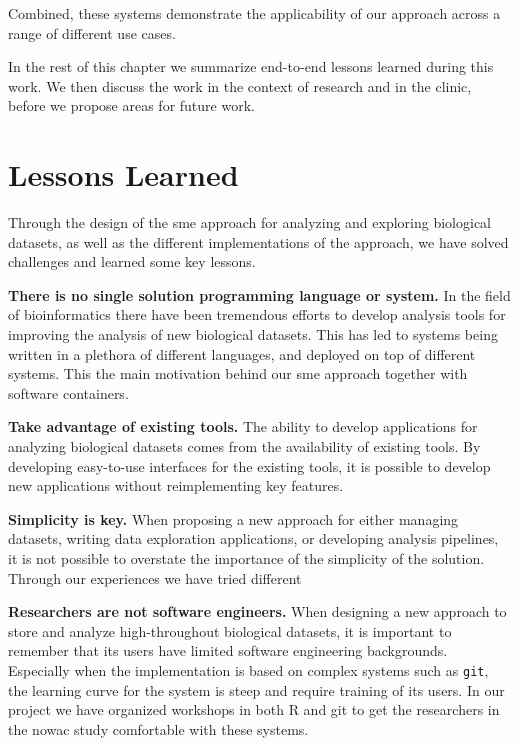 Combined, these systems demonstrate the applicability of our approach across a
range of different use cases. 

In the rest of this chapter we summarize end-to-end lessons learned during this
work. We then discuss the work in the context of research and in the clinic,
before we propose areas for future work. 


\section{Lessons Learned}
Through the design of the \gls{sme} approach for analyzing and exploring
biological datasets, as well as the different implementations of the approach,
we have solved challenges and learned some key lessons.

\textbf{There is no single solution programming language or system.} 
In the field of bioinformatics there have been tremendous efforts to develop
analysis tools for improving the analysis of new biological datasets.  This has
led to systems being written in a plethora of different languages, and deployed
on top of different systems. This the main motivation behind our \gls{sme}
approach together with software containers.

\textbf{Take advantage of existing tools.} The ability to develop applications
for analyzing biological datasets comes from the availability of existing tools.
By developing easy-to-use interfaces for the existing tools, it is possible
to develop new applications without reimplementing key features. 

\textbf{Simplicity is key.} When proposing a new approach for either managing
datasets, writing data exploration applications, or developing analysis
pipelines, it is not possible to overstate the importance of the simplicity of
the solution. Through our experiences we have tried different 

\textbf{Researchers are not software engineers.} 
When designing a new approach to store and analyze high-throughout biological
datasets, it is important to remember that its users have limited software
engineering backgrounds. Especially when the implementation is based on complex
systems such as \texttt{git}, the learning curve for the system is steep and
require training of its users. In our project we have organized workshops in
both R and git to get the researchers in the \gls{nowac} study comfortable with
these systems. 


